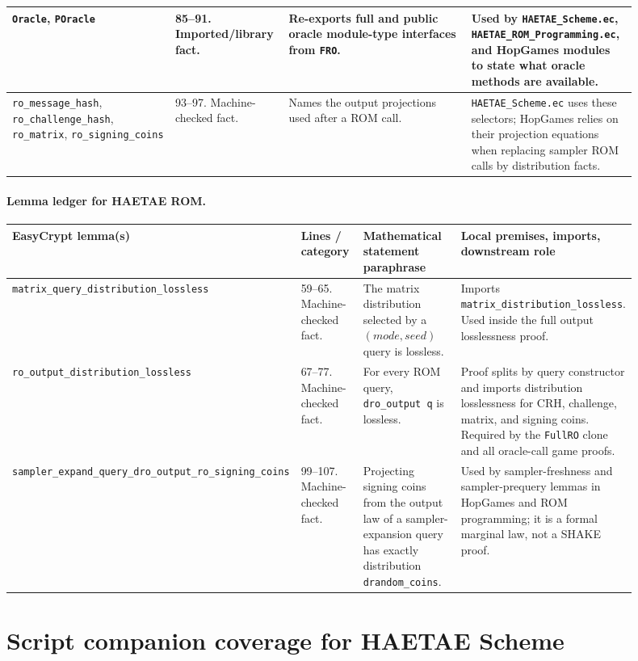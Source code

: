 \documentclass[11pt]{report}
\DeclareRobustCommand{\file}[1]{\ifmmode\text{\nolinkurl{#1}}\else\nolinkurl{#1}\fi}
\DeclareRobustCommand{\ec}[1]{\ifmmode\text{\nolinkurl{#1}}\else\nolinkurl{#1}\fi}
\theoremstyle{definition}
\theoremstyle{plain}
\begin{document}
{\begin{longtable}{p{0.25\linewidth}p{0.14\linewidth}p{0.28\linewidth}p{0.23\linewidth}}
\midrule
\ec{Oracle}, \ec{POracle} &
85--91. Imported/library fact. &
Re-exports full and public oracle module-type interfaces from \ec{FRO}. &
Used by \file{HAETAE\_Scheme.ec}, \file{HAETAE\_ROM\_Programming.ec}, and
HopGames modules to state what oracle methods are available. \\
\midrule
\ec{ro\_message\_hash}, \ec{ro\_challenge\_hash}, \ec{ro\_matrix},
\ec{ro\_signing\_coins} &
93--97. Machine-checked fact. &
Names the output projections used after a ROM call. &
\file{HAETAE\_Scheme.ec} uses these selectors; HopGames relies on their
projection equations when replacing sampler ROM calls by distribution facts. \\
\bottomrule
\end{longtable}
}

\paragraph{Lemma ledger for HAETAE ROM.}
{\footnotesize
\begin{longtable}{p{0.25\linewidth}p{0.14\linewidth}p{0.28\linewidth}p{0.23\linewidth}}
\toprule
\textbf{EasyCrypt lemma(s)} & \textbf{Lines / category} &
\textbf{Mathematical statement paraphrase} &
\textbf{Local premises, imports, downstream role} \\
\midrule
\ec{matrix\_query\_distribution\_lossless} &
59--65. Machine-checked fact. &
The matrix distribution selected by a \((mode, seed)\) query is lossless. &
Imports \ec{matrix\_distribution\_lossless}.  Used inside the full output
losslessness proof. \\
\midrule
\ec{ro\_output\_distribution\_lossless} &
67--77. Machine-checked fact. &
For every ROM query, \ec{dro\_output q} is lossless. &
Proof splits by query constructor and imports distribution losslessness for
CRH, challenge, matrix, and signing coins.  Required by the \ec{FullRO} clone
and all oracle-call game proofs. \\
\midrule
\ec{sampler\_expand\_query\_dro\_output\_ro\_signing\_coins} &
99--107. Machine-checked fact. &
Projecting signing coins from the output law of a sampler-expansion query has
exactly distribution \ec{drandom\_coins}. &
Used by sampler-freshness and sampler-prequery lemmas in HopGames and ROM
programming; it is a formal marginal law, not a SHAKE proof. \\
\bottomrule
\end{longtable}
}

\section{Script companion coverage for HAETAE Scheme}
\end{document}
